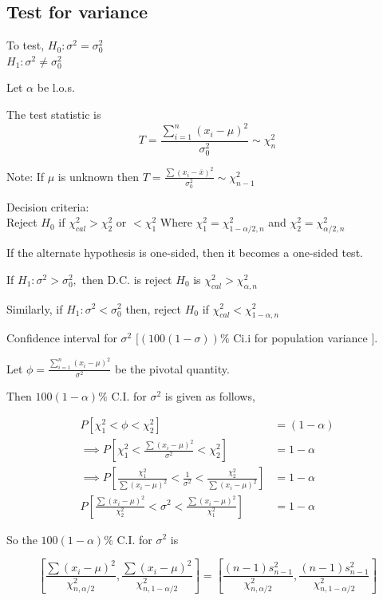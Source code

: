 \documentclass[oneside,11pt,pdftex]{book}%
\numberwithin{equation}{section}
\numberwithin{section}{chapter}
\numberwithin{equation}{chapter}
\begin{document}
\subsection{Test for variance}
To test,
$ H_0: \sigma^2= \sigma_0^2$\\
$ H_1: \sigma^2 \neq \sigma_0^2 $ 

Let $ \alpha  $ be l.o.s.

The test statistic is 
\[ T=\frac{\sum_{i=1}^n (x_i-\mu)^2}{\sigma_0^2}\sim \chi^2_n \]

Note: If $ \mu  $ is unknown then $ T=\frac{\sum (x_i-\overline{x})^2}{\sigma_0^2}\sim \chi^2_{n-1} $

Decision criteria:\\
Reject $ H_0 $ if $ \chi^2_{cal} >\chi^2_2$ or $ <\chi^2_1 $
Where $ \chi^2_1=\chi^2_{1-\alpha/2,n} $ and $ \chi^2_2=\chi^2_{\alpha/2,n} $

If the alternate hypothesis is one-sided, then it becomes a one-sided test. 

If $ H_1:\sigma^2>\sigma_0^2, $ then D.C. is reject $ H_0 $ is $ \chi^2_{cal} >\chi^2_{\alpha,n}$

Similarly, if $ H_1:\sigma^2<\sigma_0^2 $ then, reject $ H_0 $ if $ \chi^2_{cal}<\chi^2_{1-\alpha,n} $

Confidence interval for $ \sigma^2 $ 
$ [(100(1-\sigma))\% $ Ci.i for population variance $ ] $.

Let $ \phi=\frac{\sum_{i=1}^n(x_i-\mu)^2}{\sigma^2} $ be the pivotal quantity.

Then $ 100(1-\alpha)\% $ C.I. for $ \sigma^2 $ is given as follows,

\begin{align*}
	P[\chi^2_1<\phi<\chi^2_2] &=(1-\alpha)\\
	\implies P\left[\chi_1^2 < \frac{\sum (x_i-\mu)^2}{\sigma^2} < \chi_2^2\right]&=1-\alpha\\
	\implies P\left[\frac{\chi^2_1}{\sum (x_i-\mu)^2} < \frac{1}{\sigma^2}<\frac{\chi^2_2}{\sum (x_i-\mu)^2}\right]&=1-\alpha\\
	P\left[\frac{\sum (x_i-\mu)^2}{\chi^2_2} < \sigma^2 < \frac{\sum(x_i - \mu)^2}{\chi^2_1}\right]&=1-\alpha
\end{align*}

So the $ 100(1-\alpha) \%$ C.I. for $ \sigma^2 $ is 

\[ \left[\frac{\sum (x_i-\mu)^2}{\chi^2_{n, \alpha/2}}, \frac{\sum (x_i-\mu)^2}{\chi^2_{n,1-\alpha/2}}\right] = \left[\frac{(n-1)s^2_{n-1}}{\chi^2_{n,\alpha/2}},\frac{(n-1)s^2_{n-1}}{\chi^2_{n,1-\alpha/2}}\right]\]
\end{document}

